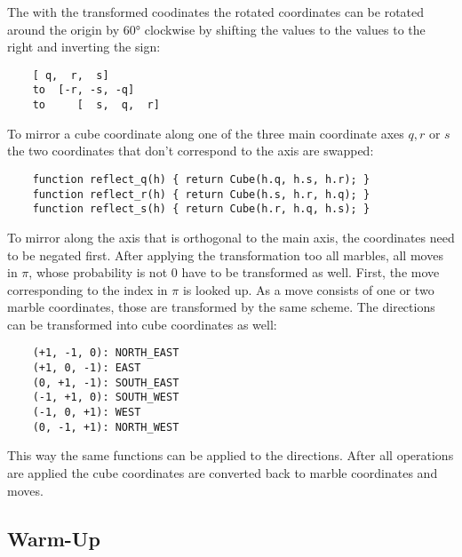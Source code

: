 The with the transformed coodinates the rotated coordinates can be rotated around the origin by 60° clockwise by shifting the values to the values to the right and inverting the sign:

\begin{BVerbatim}
    [ q,  r,  s]
    to  [-r, -s, -q]
    to     [  s,  q,  r]
\end{BVerbatim}

To mirror a cube coordinate along one of the three main coordinate axes $q, r$ or $s$ the two coordinates that don't correspond to the axis are swapped:

\begin{BVerbatim}
    function reflect_q(h) { return Cube(h.q, h.s, h.r); }
    function reflect_r(h) { return Cube(h.s, h.r, h.q); }
    function reflect_s(h) { return Cube(h.r, h.q, h.s); }
\end{BVerbatim}

To mirror along the axis that is orthogonal to the main axis, the coordinates need to be negated first. After applying the transformation too all marbles, all moves in $\pi$, whose probability is not $0$ have to be transformed as well. First, the move corresponding to the index in $\pi$ is looked up. As a move consists of one or two marble coordinates, those are transformed by the same scheme. The directions can be transformed into cube coordinates as well:

\begin{BVerbatim}
    (+1, -1, 0): NORTH_EAST
    (+1, 0, -1): EAST
    (0, +1, -1): SOUTH_EAST
    (-1, +1, 0): SOUTH_WEST
    (-1, 0, +1): WEST
    (0, -1, +1): NORTH_WEST
\end{BVerbatim}

This way the same functions can be applied to the directions. After all operations are applied the cube coordinates are converted back to marble coordinates and moves.

\subsection{Warm-Up}
